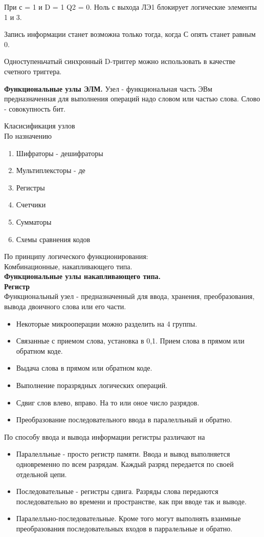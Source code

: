 При с = 1 и D = 1
Q2 = 0. Ноль с выхода ЛЭ1 блокирует логические элементы 1 и 3.

Запись информации станет возможна только тогда, когда С опять станет равным 0.

Одноступеньчатый синхронный D-триггер можно использовать в качестве счетного триггера.


\textbf{Функциональные узлы ЭЛМ. }
Узел - функциональная часть ЭВм предназначенная для выполнения операций надо словом или частью слова.
Слово - совокупность бит.

Класисификация узлов \\
По назначению
\begin{enumerate}
  \item Шифраторы - дешифраторы
  \item Мультиплексторы - де
  \item Регистры
  \item Счетчики
  \item Сумматоры
  \item Схемы сравнения кодов
\end{enumerate}
По принципу логического функционирования:\\
Комбинационные, накапливающего типа.\\

\textbf{Функциональные узлы накапливающего типа.}\\
\textbf{Регистр}\\
Функциональный узел - предназначенный для ввода, хранения, преобразования, вывода двоичного слова или его части.\\
\begin{itemize}
  \item Некоторые микрооперации можно разделить на 4 группы.
  \item Связанные с приемом слова, установка в 0,1. Прием слова в прямом или обратном коде.
  \item Выдача слова в прямом или обратном коде.
  \item Выполнение поразрядных логических операций.
  \item Сдвиг слов влево, вправо. На то или оное число разрядов.
  \item Преобразование последовательного ввода в паралелльный и обратно.
\end{itemize}


По способу ввода и вывода информации регистры различают на \\
\begin{itemize}
\item Паралелльные - просто регистр памяти.
  Ввода и вывод выполняется одновременно по всем разрядам. Каждый разряд передается по своей отдельной цепи.
\item Последовательные - регистры сдвига.
  Разряды слова передаются последовательно во времени и пространстве, как при вводе так и выводе.
\item Паралелльно-последовательные.
  Кроме того могут выполнять взаимные преобразования последовательных входов в парралельные и обратно.
\end{itemize}


